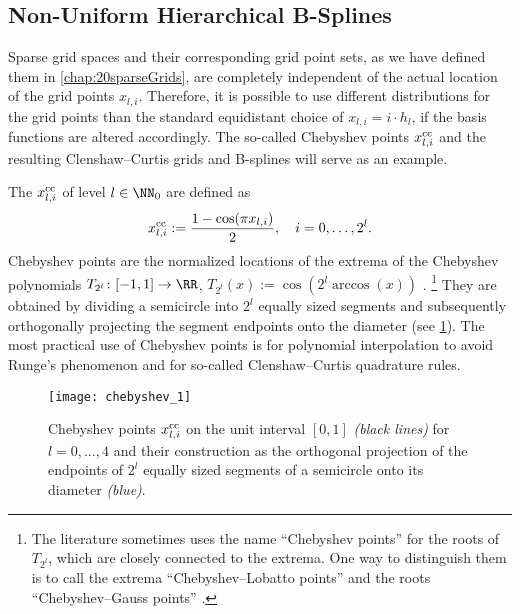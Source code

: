 \subsection{Non-Uniform Hierarchical B-Splines}

Sparse grid spaces and their corresponding grid point sets,
as we have defined them in \cref{chap:20sparseGrids},
are completely independent of the actual location of the grid points
$x_{l,i}$.
Therefore, it is possible to use different distributions for the grid points
than the standard equidistant choice of $x_{l,i} = i \cdot h_l$,
if the basis functions are altered accordingly.
The so-called Chebyshev points $x_{l,i}^{\mathrm{cc}}$ and the
resulting Clenshaw--Curtis grids and B-splines will serve as an example.

%
The  $x_{l,i}^{\mathrm{cc}}$ of level $l \in \NN_0$
are defined as
\begin{equation}
  x_{l,i}^{\mathrm{cc}}
  := \frac{1 - \cos(\pi x_{l,i})}{2},\quad
  i = 0, \dotsc, 2^l.
\end{equation}
Chebyshev points are the normalized locations of the extrema of the
Chebyshev polynomials $T_{2^l}\colon [-1, 1] \to \RR$,
$T_{2^l}(x) := \cos(2^l \arccos(x))$ \cite{Xu16Chebyshev}.%
\footnote{%
  The literature sometimes uses the name ``Chebyshev points'' for
  the roots of $T_{2^l}$, which are closely connected to the extrema.
  One way to distinguish them is to call the extrema
  ``Chebyshev--Lobatto points'' and the roots
  ``Chebyshev--Gauss points'' \cite{Xu16Chebyshev}.%
}
They are obtained by dividing a semicircle into $2^l$ equally sized
segments and subsequently orthogonally projecting the
segment endpoints onto the diameter
(see \cref{fig:chebyshev}).
The most practical use of Chebyshev points is for
polynomial interpolation to avoid Runge's phenomenon and for
so-called Clenshaw--Curtis quadrature rules.

\begin{figure}
  \texttt{[image: chebyshev\_1]}%
  \caption{%
    Chebyshev points $x_{l,i}^{\mathrm{cc}}$ on the unit interval $[0, 1]$
    \emph{(black lines)}
    for $l = 0, \dotsc, 4$
    and their construction as the orthogonal projection of the
    endpoints of $2^l$ equally sized segments
    of a semicircle onto its diameter \emph{\textcolor{C0}{(blue)}}.%
  }
  \label{fig:chebyshev}
\end{figure}

